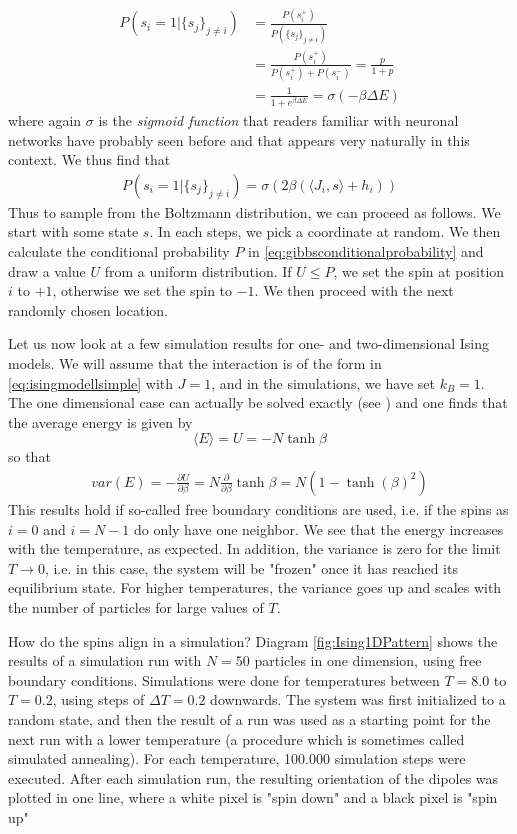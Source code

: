 \documentclass[a4paper, draft]{article}
\theoremstyle{own}
\theoremstyle{remark}
\begin{document}
\begin{align*}
P(s_i = 1 | \{ s_j\}_{j \neq i}) & = \frac{P(s_i^+)}{P(\{ s_j\}_{j \neq i})} \\
&= \frac{P(s_i^+)}{P(s_i^+) + P(s_i^-)} = \frac{p}{1 + p} \\
&= \frac{1}{1 + e^{\beta \Delta E}} = \sigma(-\beta \Delta E)
\end{align*}
where again $\sigma$ is the {\em sigmoid function} that readers familiar with neuronal networks have probably seen before and that appears very naturally in this context. We thus find that
\begin{align}\label{eq:gibbsconditionalprobability}
P(s_i = 1 | \{ s_j\}_{j \neq i}) = \sigma(2 \beta ( \langle J_i, s \rangle + h_i))
\end{align}
Thus to sample from the Boltzmann distribution, we can proceed as follows. We start with some state $s$. In each steps, we pick a coordinate at random. We then calculate the conditional probability $P$ in \eqref{eq:gibbsconditionalprobability} and draw a value $U$ from a uniform distribution. If $U \leq P$, we set the spin at position $i$ to $+1$, otherwise we set the spin to $-1$. We then proceed with the next randomly chosen location.

Let us now look at a few simulation results for one- and two-dimensional Ising models. We will assume that the interaction is of the form in \eqref{eq:isingmodellsimple} with $J = 1$, and in the simulations, we have set $k_B = 1$. The one dimensional case can actually be solved exactly (see \cite{Schroeder}) and one finds that the average energy is given by
$$
\langle E \rangle = U = -N \tanh \beta
$$
so that
\begin{align*}
var(E) = - \frac{\partial U}{\partial \beta}  
= N \frac{\partial }{\partial \beta} \tanh \beta 
= N (1 - \tanh(\beta)^2)
\end{align*}
This results hold if so-called free boundary conditions are used, i.e. if the spins as $i=0$ and $i=N-1$ do only have one neighbor. 
We see that the energy increases with the temperature, as expected. In addition, the variance is zero for the limit $T \rightarrow 0$, i.e. in this case, the system will be "frozen" once it has reached its equilibrium state. For higher temperatures, the variance goes up and scales with the number of particles for large values of $T$. 

How do the spins align in a simulation? Diagram \ref{fig:Ising1DPattern} shows the results of a simulation run with $N = 50$ particles in one dimension, using free boundary conditions. Simulations were done for temperatures between $T = 8.0$ to $T = 0.2$, using steps of $\Delta T = 0.2$ downwards. The system was first initialized to a random state, and then the result of a run was used as a starting point for the next run with a lower temperature (a procedure which is sometimes called simulated annealing). For each temperature, 100.000 simulation steps were executed. After each simulation run, the resulting orientation of the dipoles was plotted in one line, where a white pixel is "spin down" and a black pixel is "spin up"
\end{document}
